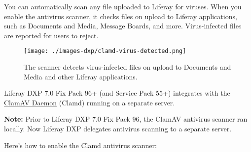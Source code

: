 You can automatically scan any file uploaded to Liferay for viruses.
When you enable the antivirus scanner, it checks files on upload to
Liferay applications, such as Documents and Media, Message Boards, and
more. Virus-infected files are reported for users to reject.

\begin{figure}
\centering
\texttt{[image: ./images-dxp/clamd-virus-detected.png]}
\caption{The scanner detects virus-infected files on upload to Documents
and Media and other Liferay applications.}
\end{figure}

Liferay DXP 7.0 Fix Pack 96+ (and Service Pack 55+) integrates with the
\href{https://www.clamav.net/documents/scanning\#clamd}{ClamAV Daemon}
(Clamd) running on a separate server.

\textbf{Note:} Prior to Liferay DXP 7.0 Fix Pack 96, the ClamAV
antivirus scanner ran locally. Now Liferay DXP delegates antivirus
scanning to a separate server.

Here's how to enable the Clamd antivirus scanner:

